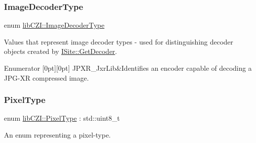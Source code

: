\mbox{\label{namespacelib_c_z_i_a68cd7521fd89880f820ea55baf6f6179}} 
\subsubsection{\texorpdfstring{Image\+Decoder\+Type}{ImageDecoderType}}
{\footnotesize\ttfamily enum \hyperlink{namespacelib_c_z_i_a68cd7521fd89880f820ea55baf6f6179}{lib\+C\+Z\+I\+::\+Image\+Decoder\+Type}\hspace{0.3cm}{\ttfamily [strong]}}

Values that represent image decoder types -\/ used for distinguishing decoder objects created by {\ttfamily \hyperlink{classlib_c_z_i_1_1_i_site_a2cbf7eccd867378b4943519284b98ef1}{I\+Site\+::\+Get\+Decoder}}. \begin{DoxyEnumFields}{Enumerator}
[0pt][0pt]{}\mbox{\label{namespacelib_c_z_i_a68cd7521fd89880f820ea55baf6f6179a843daf124e8ac9b9d6e02c87c0bdb580}} 
J\+P\+X\+R\+\_\+\+Jxr\+Lib&Identifies an encoder capable of decoding a J\+P\+G-\/\+XR compressed image. \\
\hline

\end{DoxyEnumFields}
\mbox{\label{namespacelib_c_z_i_abf8ce12ab88b06c8b3b47efbb5e2e834}} 
\subsubsection{\texorpdfstring{Pixel\+Type}{PixelType}}
{\footnotesize\ttfamily enum \hyperlink{namespacelib_c_z_i_abf8ce12ab88b06c8b3b47efbb5e2e834}{lib\+C\+Z\+I\+::\+Pixel\+Type} \+: std\+::uint8\+\_\+t\hspace{0.3cm}{\ttfamily [strong]}}



An enum representing a pixel-\/type. 

